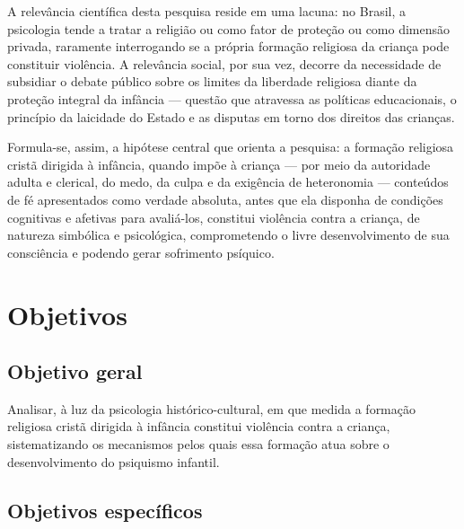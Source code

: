 \documentclass[
    a4paper,
    12pt,
    oneside,
    section=TITLE,
    brazilian,
    english
]{abntex2}
\begin{document}
A relevância científica desta pesquisa reside em uma lacuna: no Brasil, a psicologia tende a tratar a religião ou como fator de proteção ou como dimensão privada, raramente interrogando se a própria formação religiosa da criança pode constituir violência. A relevância social, por sua vez, decorre da necessidade de subsidiar o debate público sobre os limites da liberdade religiosa diante da proteção integral da infância --- questão que atravessa as políticas educacionais, o princípio da laicidade do Estado e as disputas em torno dos direitos das crianças.

Formula-se, assim, a hipótese central que orienta a pesquisa: a formação religiosa cristã dirigida à infância, quando impõe à criança --- por meio da autoridade adulta e clerical, do medo, da culpa e da exigência de heteronomia --- conteúdos de fé apresentados como verdade absoluta, antes que ela disponha de condições cognitivas e afetivas para avaliá-los, constitui violência contra a criança, de natureza simbólica e psicológica, comprometendo o livre desenvolvimento de sua consciência e podendo gerar sofrimento psíquico.

\section{Objetivos}

\subsection{Objetivo geral}

Analisar, à luz da psicologia histórico-cultural, em que medida a formação religiosa cristã dirigida à infância constitui violência contra a criança, sistematizando os mecanismos pelos quais essa formação atua sobre o desenvolvimento do psiquismo infantil.

\subsection{Objetivos específicos}
\end{document}
